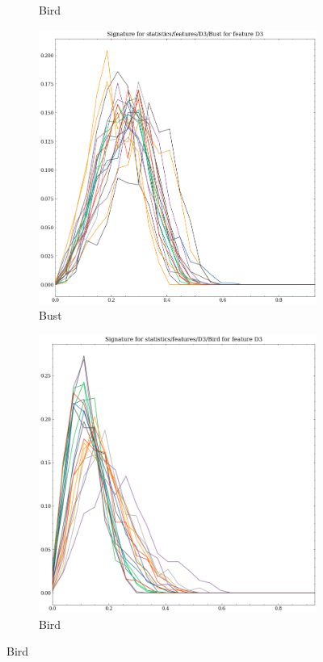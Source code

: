 \begin{figure}[t!p]
\begin{subfigure}[b]{0.23\textwidth}
        \caption{Bird}
    \end{subfigure}
    \hfill
    \begin{subfigure}[b]{0.23\textwidth}
        \includegraphics[width=\textwidth]{assets/feature_extraction/D3/Bust.png}
        \caption{Bust}
    \end{subfigure}
    \hfill
    \begin{subfigure}[b]{0.23\textwidth}
        \includegraphics[width=\textwidth]{assets/feature_extraction/D3/Bird.png}
        \caption{Bird}
        \label{fig:features-statistics-D3-h}    
    \end{subfigure}
    \hfill
    

\end{figure}
